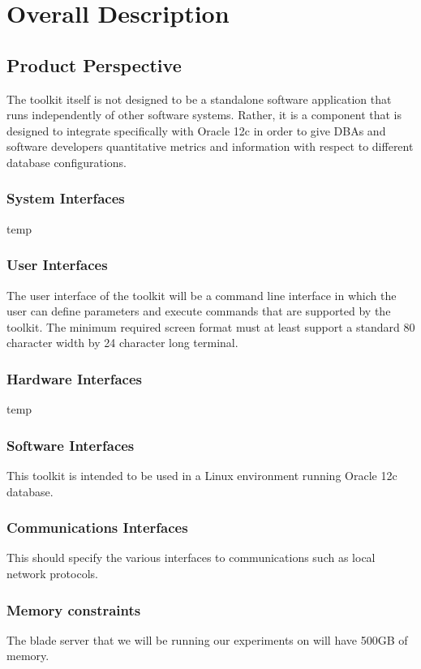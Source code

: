 \documentclass[draftclsnofoot, onecolumn, 10pt]{IEEEtran}
\begin{document}
\section{Overall Description}

\subsection{Product Perspective}
The toolkit itself is not designed to be a standalone software application that runs independently of other software systems. Rather, it is a component that is designed to integrate specifically with Oracle 12c in order to give DBAs and software developers quantitative metrics and information with respect to different database configurations.

\subsubsection{System Interfaces}
temp

\subsubsection{User Interfaces}
The user interface of the toolkit will be a command line interface in which the user can define parameters and execute commands that are supported by the toolkit. The minimum required screen format must at least support a standard 80 character width by 24 character long terminal.

\subsubsection{Hardware Interfaces}
temp

\subsubsection{Software Interfaces}
This toolkit is intended to be used in a Linux environment running Oracle 12c database.

\subsubsection{Communications Interfaces}
This should specify the various interfaces to communications such as local network protocols.

\subsubsection{Memory constraints}
The blade server that we will be running our experiments on will have 500GB of memory. 
\end{document}
